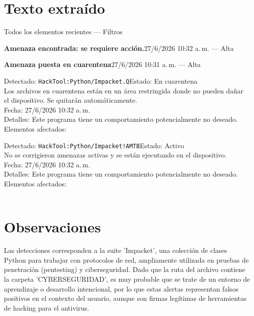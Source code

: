 \documentclass[11pt,a4paper]{article}
\begin{document}
\section*{Texto extraído}
\begin{tcolorbox}[cajaContenido, title=Transcripción de texto visible en las imágenes]
{\small
Todos los elementos recientes --- Filtros

\textbf{Amenaza encontrada: se requiere acción.}\hfill 27/6/2026 10:32 a.\,m. --- Alta

\textbf{Amenaza puesta en cuarentena}\hfill 27/6/2026 10:31 a.\,m. --- Alta

\medskip
Detectado: \texttt{HackTool:Python/Impacket.Q}\hfill Estado: En cuarentena\\
Los archivos en cuarentena están en un área restringida donde no pueden dañar el dispositivo.
Se quitarán automáticamente.\\
Fecha: 27/6/2026 10:32 a.\,m.\\
Detalles: Este programa tiene un comportamiento potencialmente no deseado.\\
Elementos afectados:\\

\medskip
Detectado: \texttt{HackTool:Python/Impacket!AMTB}\hfill Estado: Activo\\
No se corrigieron amenazas activas y se están ejecutando en el dispositivo.\\
Fecha: 27/6/2026 10:32 a.\,m.\\
Detalles: Este programa tiene un comportamiento potencialmente no deseado.\\
Elementos afectados:\\
\\
}
\end{tcolorbox}

\section*{Observaciones}
Las detecciones corresponden a la suite 'Impacket', una colección de clases Python para trabajar con protocolos de red, ampliamente utilizada en pruebas de penetración (pentesting) y ciberseguridad. Dado que la ruta del archivo contiene la carpeta 'CYBERSEGURIDAD', es muy probable que se trate de un entorno de aprendizaje o desarrollo intencional, por lo que estas alertas representan falsos positivos en el contexto del usuario, aunque son firmas legítimas de herramientas de hacking para el antivirus.
\end{document}
